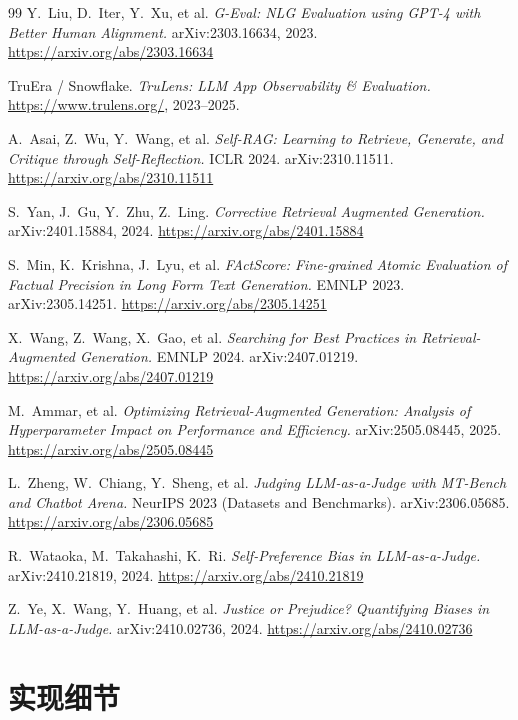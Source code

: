 \documentclass[11pt,a4paper,fontset=fandol]{ctexart}
\begin{document}
\begin{thebibliography}{99}
Y.~Liu, D.~Iter, Y.~Xu, et al.
\emph{G-Eval: NLG Evaluation using GPT-4 with Better Human Alignment.}
arXiv:2303.16634, 2023.
\url{https://arxiv.org/abs/2303.16634}

TruEra / Snowflake.
\emph{TruLens: LLM App Observability \& Evaluation.}
\url{https://www.trulens.org/}, 2023--2025.

A.~Asai, Z.~Wu, Y.~Wang, et al.
\emph{Self-RAG: Learning to Retrieve, Generate, and Critique through Self-Reflection.}
ICLR 2024. arXiv:2310.11511.
\url{https://arxiv.org/abs/2310.11511}

S.~Yan, J.~Gu, Y.~Zhu, Z.~Ling.
\emph{Co{}rrective Retrieval Augmented Generation.}
arXiv:2401.15884, 2024.
\url{https://arxiv.org/abs/2401.15884}

S.~Min, K.~Krishna, J.~Lyu, et al.
\emph{FActScore: Fine-grained Atomic Evaluation of Factual Precision in Long Form Text Generation.}
EMNLP 2023. arXiv:2305.14251.
\url{https://arxiv.org/abs/2305.14251}

X.~Wang, Z.~Wang, X.~Gao, et al.
\emph{Searching for Best Practices in Retrieval-Augmented Generation.}
EMNLP 2024. arXiv:2407.01219.
\url{https://arxiv.org/abs/2407.01219}

M.~Ammar, et al.
\emph{Optimizing Retrieval-Augmented Generation: Analysis of Hyperparameter Impact on Performance and Efficiency.}
arXiv:2505.08445, 2025.
\url{https://arxiv.org/abs/2505.08445}

L.~Zheng, W.~Chiang, Y.~Sheng, et al.
\emph{Judging LLM-as-a-Judge with MT-Bench and Chatbot Arena.}
NeurIPS 2023 (Datasets and Benchmarks). arXiv:2306.05685.
\url{https://arxiv.org/abs/2306.05685}

R.~Wataoka, M.~Takahashi, K.~Ri.
\emph{Self-Preference Bias in LLM-as-a-Judge.}
arXiv:2410.21819, 2024.
\url{https://arxiv.org/abs/2410.21819}

Z.~Ye, X.~Wang, Y.~Huang, et al.
\emph{Justice or Prejudice? Quantifying Biases in LLM-as-a-Judge.}
arXiv:2410.02736, 2024.
\url{https://arxiv.org/abs/2410.02736}

\end{thebibliography}

\clearpage
\appendix

\section{实现细节}
\label{app:impl}
\end{document}
